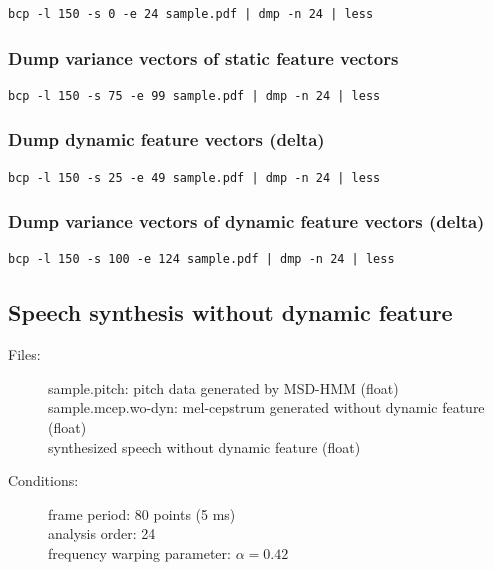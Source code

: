 \documentclass[a4paper,10pt]{article}
\begin{document}
\begin{verbatim}
bcp -l 150 -s 0 -e 24 sample.pdf | dmp -n 24 | less
\end{verbatim}

\subsubsection{Dump variance vectors of static feature vectors}

\begin{verbatim}
bcp -l 150 -s 75 -e 99 sample.pdf | dmp -n 24 | less
\end{verbatim}

\subsubsection{Dump dynamic feature vectors (delta)}

\begin{verbatim}
bcp -l 150 -s 25 -e 49 sample.pdf | dmp -n 24 | less
\end{verbatim}

\subsubsection{Dump variance vectors of dynamic feature vectors (delta)}

\begin{verbatim}
bcp -l 150 -s 100 -e 124 sample.pdf | dmp -n 24 | less
\end{verbatim}

\subsection{Speech synthesis without dynamic feature}

\begin{description}
\item[Files:]
  sample.pitch: pitch data generated by MSD-HMM (float)\\
  sample.mcep.wo-dyn: mel-cepstrum generated without dynamic
  feature (float) \\
  synthesized speech without dynamic feature (float)
\item[Conditions:]
  frame period: 80 points (5 ms)\\
  analysis order: 24\\
  frequency warping parameter: $\alpha = 0.42$
\end{description}
\end{document}
